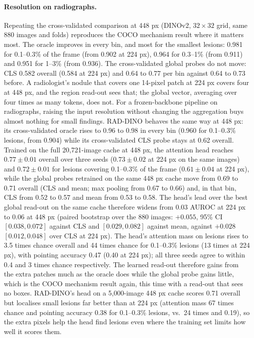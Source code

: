 \documentclass[10pt,letterpaper,twocolumn]{article}
\begin{document}
\paragraph{Resolution on radiographs.}
Repeating the cross-validated comparison at 448 px (DINOv2, $32\times32$ grid, same 880
images and folds) reproduces the COCO mechanism result where it matters most. The oracle
improves in every bin, and most for the smallest lesions: 0.981 for 0.1--0.3\% of the frame
(from 0.902 at 224 px), 0.964 for 0.3--1\% (from 0.911) and 0.951 for 1--3\% (from 0.936). The
cross-validated global probes do not move: CLS 0.582 overall (0.584 at 224 px) and 0.64 to
0.77 per bin against 0.64 to 0.73 before. A radiologist's nodule that covers one 14-pixel
patch at 224 px covers four at 448 px, and the region read-out sees that; the global vector,
averaging over four times as many tokens, does not. For a frozen-backbone pipeline on
radiographs, raising the input resolution without changing the aggregation buys almost nothing for
small findings. RAD-DINO behaves the same way at 448 px: its cross-validated oracle rises to
0.96 to 0.98 in every bin (0.960 for 0.1--0.3\% lesions, from 0.904) while its cross-validated
CLS probe stays at 0.62 overall. Trained on the full 20,721-image cache at 448 px, the attention head reaches $0.77\pm0.01$ overall over three seeds ($0.73\pm0.02$ at 224 px on the same images) and $0.72\pm0.01$ for lesions covering 0.1--0.3\% of the frame ($0.61\pm0.04$ at 224 px), while the global probes retrained on the same 448 px cache move from 0.69 to 0.71 overall (CLS and mean; max pooling from 0.67 to 0.66) and, in that bin, CLS from 0.52 to 0.57 and mean from 0.53 to 0.58. The head's lead over the best global read-out on the same cache therefore widens from 0.03 AUROC at 224 px to 0.06 at 448 px (paired bootstrap over the 880 images: $+0.055$, 95\% CI $[0.038, 0.072]$ against CLS and $[0.029, 0.082]$ against mean, against $+0.028$ $[0.012, 0.048]$ over CLS at 224 px). The head's attention mass on lesions rises to 3.5 times chance overall and 44 times chance for 0.1--0.3\% lesions (13 times at 224 px), with pointing accuracy 0.47 (0.40 at 224 px); all three seeds agree to within 0.4 and 3 times chance respectively. The learned read-out therefore gains from the extra patches much as the oracle does while the global probe gains little, which is the COCO mechanism result again, this time with a read-out that sees no boxes. RAD-DINO's head on a 5,000-image 448 px cache scores 0.71 overall but
localises small lesions far better than at 224 px (attention mass 67 times chance and
pointing accuracy 0.38 for 0.1--0.3\% lesions, vs.\ 24 times and 0.19), so the extra pixels
help the head find lesions even where the training set limits how well it scores them.
\end{document}
